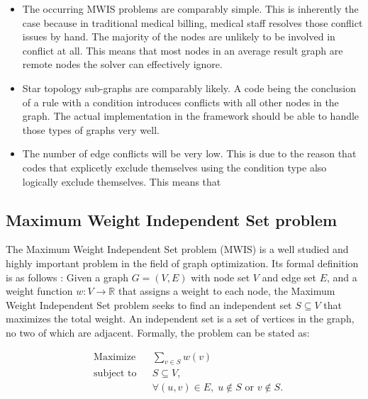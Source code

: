 \begin{itemize}
    \item The occurring MWIS problems are comparably simple.
    This is inherently the case because in traditional medical billing,
    medical staff resolves those conflict issues by hand.
    The majority of the nodes are unlikely to be involved in conflict at all.
    This means that most nodes in an average result graph are remote nodes the solver can effectively ignore.
    \item Star topology sub-graphs are comparably likely.
    A code
    being the conclusion of a rule with a condition  introduces conflicts with all other nodes in the graph.
    The actual implementation in the framework should be able to handle those types of graphs very well.
    \item The number of edge conflicts will be very low.
    This is due to the reason
    that codes that explicetly exclude themselves
    using the  condition type also logically exclude themselves.
    This means that
\end{itemize}

\subsection{Maximum Weight Independent Set problem}\label{subsec:maximum-weight-independent-set-problem}

The Maximum Weight Independent Set problem (MWIS)
is a well studied and highly important problem in the field of graph optimization.
Its formal definition is as follows \cite{SAKAI2003313}:
Given a graph $G = (V, E)$ with node set $V$ and edge set $E$,
and a weight function $w: V \rightarrow \mathbb{R}$ that assigns a weight to each node,
the Maximum Weight Independent Set problem seeks
to find an independent set $S \subseteq V$ that maximizes the total weight.
An independent set is a set of vertices in the graph, no two of which are adjacent.
Formally, the problem can be stated as:

\begin{equation}
    \begin{aligned}
        & \text{Maximize}
        & & \sum_{v \in S} w(v) \\
        & \text{subject to}
        & & S \subseteq V, \\
        &&& \forall (u, v) \in E, \; u \notin S \text{ or } v \notin S.
    \end{aligned}\label{eq:mwis}
\end{equation}


